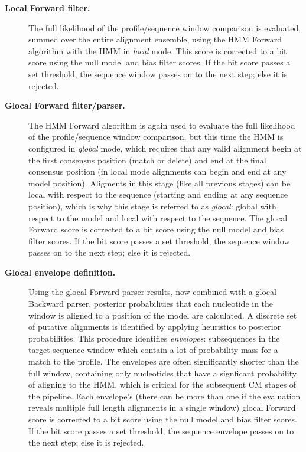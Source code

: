 \begin{description}
\begin{description}
\item[\textbf{Local Forward filter.}] The full likelihood of
  the profile/sequence window comparison is evaluated, summed over the
  entire alignment ensemble, using the HMM Forward algorithm with the
  HMM in \emph{local} mode. This score is corrected to a bit score using the
  null model and bias filter scores. If the bit score passes a set
  threshold, the sequence window passes on to the next step; else it
  is rejected.

\item[\textbf{Glocal Forward filter/parser.}]  The HMM Forward
  algorithm is again used to evaluate the full likelihood of the
  profile/sequence window comparison, but this time the HMM is
  configured in \emph{global} mode, which requires that any valid
  alignment begin at the first consensus position (match or delete)
  and end at the final consensus position (in local mode alignments
  can begin and end at any model position). Aligments in this stage
  (like all previous stages) can be local with respect to the sequence
  (starting and ending at any sequence position), which is why this
  stage is referred to as \emph{glocal}: global with respect to the
  model and local with respect to the sequence. The glocal Forward
  score is corrected to a bit score using the null model and bias
  filter scores. If the bit score passes a set threshold, the sequence
  window passes on to the next step; else it is rejected.
  
\item[\textbf{Glocal envelope definition.}] Using the glocal Forward
  parser results, now combined with a glocal Backward parser,
  posterior probabilities that each nucleotide in the window is aligned
  to a position of the model are calculated. A discrete set of
  putative alignments is identified by applying heuristics to
  posterior probabilities. This procedure identifies \emph{envelopes}:
  subsequences in the target sequence window which contain a lot of
  probability mass for a match to the profile. The envelopes are often
  significantly shorter than the full window, containing only nucleotides
  that have a signficant probability of aligning to the HMM, which is
  critical for the subsequent CM stages of the pipeline. Each
  envelope's (there can be more than one if the evaluation reveals
  multiple full length alignments in a single window) glocal Forward
  score is corrected to a bit score using the null model and bias
  filter scores. If the bit score passes a set threshold, the sequence
  envelope passes on to the next step; else it is rejected.


\end{description}
\end{description}
